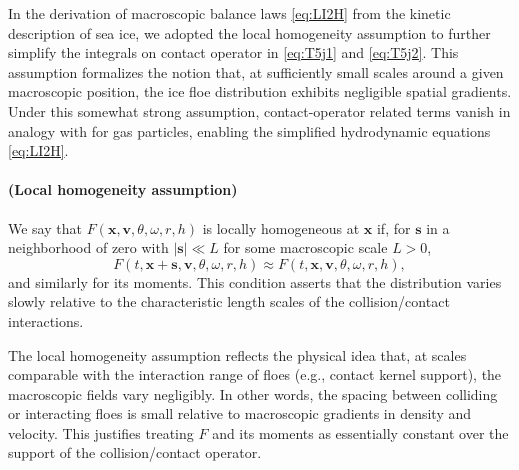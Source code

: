 \documentclass[a4paper,11pt]{article}
\numberwithin{equation}{section}
\theoremstyle{definition}
\newcommand{\bfss}{\boldsymbol{s}}
\newcommand{\bfx}{\boldsymbol{x}}
\newcommand{\bfv}{\boldsymbol{v}}
\newcommand{\bbr}{\mathbb R}
\begin{document}
%

%
%



\vspace{1cm}
\label{app:locassum}

In the derivation of macroscopic balance laws \eqref{eq:LI2H} from the kinetic description of sea ice, we adopted the local homogeneity assumption to further simplify the integrals on contact operator in \eqref{eq:T5j1} and \eqref{eq:T5j2}. 
This assumption formalizes the notion that, at sufficiently small scales around a given macroscopic position, the ice floe distribution exhibits negligible spatial gradients. Under this somewhat strong assumption, contact-operator related terms vanish in analogy with \cite{bardos1991fluid,golse2003mean,golse2005boltzmann} for gas particles, enabling the simplified hydrodynamic equations \eqref{eq:LI2H}.


\paragraph{(Local homogeneity assumption)}
We say that \(F(\bfx,\bfv,\theta, \omega, r,h)\) is locally homogeneous at \(\bfx\) if, for \(\bfss\) in a neighborhood of zero with \(|\bfss|\ll L\) for some macroscopic scale \(L>0\),
\begin{equation*} \label{eq:lochomo}
F(t,\bfx+\bfss,\bfv,\theta, \omega, r,h)\approx F(t,\bfx,\bfv,\theta, \omega, r,h),
\end{equation*}
and similarly for its moments.
This condition asserts that the distribution varies slowly relative to the characteristic length scales of the collision/contact interactions.

The local homogeneity assumption reflects the physical idea that, at scales comparable with the interaction range of floes (e.g., contact kernel support), the macroscopic fields vary negligibly. In other words, the spacing between colliding or interacting floes is small relative to macroscopic gradients in density and velocity. This justifies treating \(F\) and its moments as essentially constant over the support of the collision/contact operator.
\end{document}
